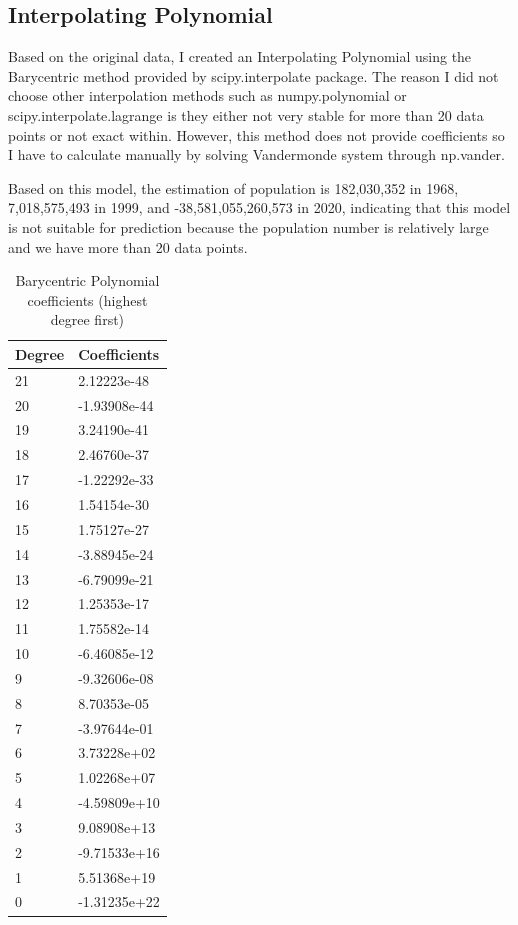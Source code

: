 \documentclass[11pt]{article}
\begin{document}
\subsection{Interpolating Polynomial}
Based on the original data, I created an Interpolating Polynomial using the Barycentric method provided by scipy.interpolate package. The reason I did not choose other interpolation methods such as numpy.polynomial or scipy.interpolate.lagrange is they either not very stable for more than 20 data points or not exact within. However, this method does not provide coefficients so I have to calculate manually by solving Vandermonde system through np.vander.

Based on this model, the estimation of population is 182,030,352 in 1968, 7,018,575,493 in 1999, and -38,581,055,260,573 in 2020, indicating that this model is not suitable for prediction because the population number is relatively large and we have more than 20 data points.

\begin{table}[H]
    \centering
    \begin{tabular}{ll}
        \toprule
        Degree & Coefficients \\
        \midrule
        21 & 2.12223e-48 \\
        20 & -1.93908e-44 \\
        19 & 3.24190e-41 \\
        18 & 2.46760e-37 \\
        17 & -1.22292e-33 \\
        16 & 1.54154e-30 \\
        15 & 1.75127e-27 \\
        14 & -3.88945e-24 \\
        13 & -6.79099e-21 \\
        12 & 1.25353e-17 \\
        11 & 1.75582e-14 \\
        10 & -6.46085e-12 \\
        9 & -9.32606e-08 \\
        8 & 8.70353e-05 \\
        7 & -3.97644e-01 \\
        6 & 3.73228e+02 \\
        5 & 1.02268e+07 \\
        4 &  -4.59809e+10 \\
        3 & 9.08908e+13 \\
        2 & -9.71533e+16 \\
        1 & 5.51368e+19 \\
        0 & -1.31235e+22 \\
        \bottomrule
    \end{tabular}
    \caption{Barycentric Polynomial coefficients (highest degree first)}
\end{table}
\end{document}
